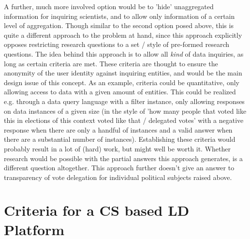 A further, much more involved option would be to 'hide' unaggregated information for inquiring scientists, and to allow only information of a certain level of aggregation. Though similar to the second option posed above, this is quite a different approach to the problem at hand, since this approach explicitly opposes restricting research questions to a set / style of pre-formed research questions. The idea behind this approach is to allow all \textit{kind} of data inquiries, as long as certain criteria are met. These criteria are thought to ensure the anonymity of the user identity against inquiring entities, and would be the main design issue of this concept. As an example, criteria could be quantitative, only allowing access to data with a given amount of entities. This could be realized e.g. through a data query language with a filter instance, only allowing responses on data instances of a given size (in the style of 'how many people that voted like this in elections of this context voted like that / delegated votes' with a negative response when there are only a handful of instances and a valid answer when there are a substantial number of instances). Establishing these criteria would probably result in a lot of (hard) work, but might well be worth it. Whether research would be possible with the partial answers this approach generates, is a different question altogether. 
This approach further doesn't give an answer to transparency of vote delegation for individual political subjects raised above.

\section{Criteria for a CS based LD Platform}
\label{sec:Criteria}
